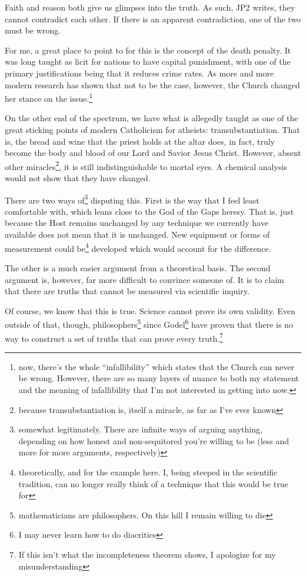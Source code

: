 \documentclass[12pt]{article}[titlepage]
\newcommand{\say}[1]{``#1''}
\newcommand{\1}{\={a}}
\newcommand{\2}{\={e}}
\newcommand{\3}{\={\i}}
\newcommand{\4}{\=o}
\newcommand{\5}{\=u}
\newcommand{\6}{\={A}}
\renewcommand{\,}{\textsuperscript{,}}
\begin{document}
Faith and reason both give us glimpses into the truth.
As such, JP2 writes, they cannot contradict each other.
If there is an apparent contradiction, one of the two must be wrong.

For me, a great place to point to for this is the concept of the death penalty.
It was long taught as licit for nations to have capital punishment, with one of the primary justifications being that it reduces crime rates.
As more and more modern research has shown that not to be the case, however, the Church changed her stance on the issue.\footnote{now, there's the whole \say{infallibility} which states that the Church can never be wrong. However, there are so many layers of nuance to both my statement and the meaning of infallibility that I'm not interested in getting into now.}

On the other end of the spectrum, we have what is allegedly taught as one of the great sticking points of modern Catholicism for atheists: transubstantiation.
That is, the bread and wine that the priest holds at the altar does, in fact, truly become the body and blood of our Lord and Savior Jesus Christ.
However, absent other miracles\footnote{because transubstantiation is, itself a miracle, as far as I've ever known}, it is still indistinguishable to mortal eyes.
A chemical analysis would not show that they have changed.

There are two ways of\footnote{somewhat legitimately. There are infinite ways of arguing anything, depending on how honest and non-sequitored you're willing to be (less and more for more arguments, respectively)} disputing this.
First is the way that I feel least comfortable with, which leans close to the God of the Gaps heresy.
That is, just because the Host remains unchanged by any technique we currently have available does not mean that it is unchanged.
New equipment or forms of measurement could be\footnote{theoretically, and for the example here. I, being steeped in the scientific tradition, can no longer really think of a technique that this would be true for} developed which would account for the difference.

The other is a much easier argument from a theoretical basis.
The second argument is, however, far more difficult to convince someone of.
It is to claim that there are truths that cannot be measured via scientific inquiry.

Of course, we know that this is true.
Science cannot prove its own validity.
Even outside of that, though, philosophers\footnote{mathematicians are philosophers. On this hill I remain willing to die} since Godel\footnote{I may never learn how to do diacritics} have proven that there is no way to construct a set of truths that can prove every truth.\footnote{If this isn't what the incompleteness theorem shows, I apologize for my misunderstanding}
\end{document}
